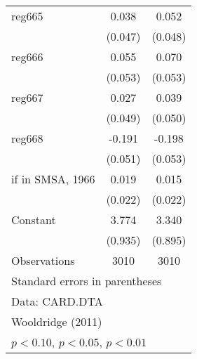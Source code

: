 \begin{table}[htbp]
\begin{tabular}{l*{2}{c}}
\addlinespace
reg665              &       0.038         &       0.052         \\
                    &     (0.047)         &     (0.048)         \\
\addlinespace
reg666              &       0.055         &       0.070         \\
                    &     (0.053)         &     (0.053)         \\
\addlinespace
reg667              &       0.027         &       0.039         \\
                    &     (0.049)         &     (0.050)         \\
\addlinespace
reg668              &      -0.191\sym{***}&      -0.198\sym{***}\\
                    &     (0.051)         &     (0.053)         \\
\addlinespace
=1 if in SMSA, 1966 &       0.019         &       0.015         \\
                    &     (0.022)         &     (0.022)         \\
\addlinespace
Constant            &       3.774\sym{***}&       3.340\sym{***}\\
                    &     (0.935)         &     (0.895)         \\
\midrule
Observations        &        3010         &        3010         \\
\bottomrule
\multicolumn{3}{l}{\footnotesize Standard errors in parentheses}\\
\multicolumn{3}{l}{\footnotesize Data: CARD.DTA}\\
\multicolumn{3}{l}{\footnotesize Wooldridge (2011)}\\
\multicolumn{3}{l}{\footnotesize \sym{*} \(p<0.10\), \sym{**} \(p<0.05\), \sym{***} \(p<0.01\)}\\
\end{tabular}
\end{table}
